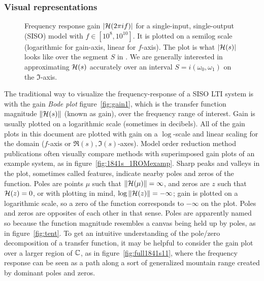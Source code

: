 \subsubsection{Visual representations}
 \begin{figure}[hp]
                \centering
              \hfill       
                \caption{Frequency response gain $\vert \mathcal{H}(2\pi i f) \vert$ for a 
                single-input, single-output (SISO) model with $f\in \left[10^8,10^{10}\right]$.  It is plotted on a semilog scale (logarithmic for gain-axis, linear for $f$-axis).  The plot  is what $\vert \mathcal{H}(s) \vert$  looks like over the segment $S$ in . We are generally interested in approximating $\mathcal{H}(s)$ accurately over an interval 
$S=i(\omega_0, \omega_1)$ on the $\Im$-axis.}
                \label{fig:ex1b_tfunc}
 \end{figure}
The traditional way to visualize the frequency-response of a SISO LTI system is with the gain \emph{Bode plot} figure~\ref{fig:gain1}, which is the transfer function magnitude $\|\mathcal{H}(s)\|$ (known as gain),  over the frequency range of interest. Gain is usually plotted on a logarithmic scale (sometimes in decibels).  All of the gain plots in this document are plotted with gain on a $\log$-scale  and linear scaling for the domain ($f$-axis or $\Re(s), \Im(s)$-axes).    Model order reduction method publications often visually compare methods with superimposed gain plots of an example system, as in figure~\ref{fig:1841s_1ROMexamp}.     Sharp peaks and valleys in the plot, sometimes called  features, indicate nearby poles and zeros of the function.  Poles are points $\mu$ such that $\| \mathcal{H}(\mu)\|=\infty$, and zeros are $z$ such that  $\mathcal{H}(z)=0$, or with plotting in mind, $\log \|\mathcal{H}(z) \|= -\infty$;  gain is plotted on a logarithmic scale, so a zero of the function corresponds to $-\infty$ on the plot.  
 Poles and zeros are opposites of each other in that sense.  Poles are apparently named so because the function magnitude resembles a canvas being held up by poles, as in figure~\ref{fig:tent}.  
To get an intuitive understanding of the pole/zero decomposition of a transfer function, it may be helpful to consider the gain plot over a larger region of $\mathbb{C}$, as in figure~\ref{fig:full1841s11}, where the frequency response can be seen as  a path along a sort of generalized mountain range created by dominant poles and zeros.   

